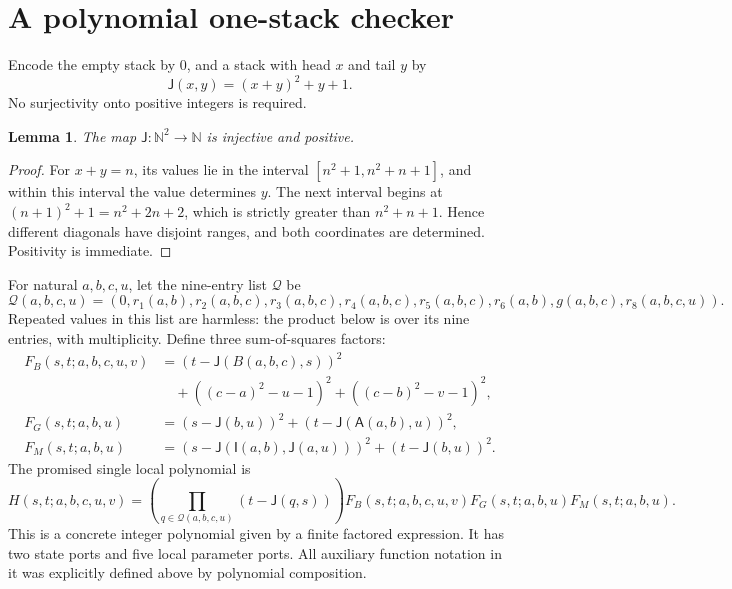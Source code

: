 \documentclass[11pt]{article}
\newcommand{\N}{\mathbb N}
\newcommand{\Imp}{\mathsf I}
\newcommand{\All}{\mathsf A}
\newcommand{\J}{\mathsf J}
\newtheorem{lemma}{Lemma}
\begin{document}
\section{A polynomial one-stack checker}

Encode the empty stack by 0, and a stack with head \(x\) and tail \(y\) by
\[
  \J(x,y)=(x+y)^2+y+1.
\]
No surjectivity onto positive integers is required.

\begin{lemma}
The map \(\J:\N^2\to\N\) is injective and positive.
\end{lemma}
\begin{proof}
For \(x+y=n\), its values lie in the interval
\([n^2+1,n^2+n+1]\), and within this interval the value determines \(y\).
The next interval begins at \((n+1)^2+1=n^2+2n+2\), which is strictly
greater than \(n^2+n+1\). Hence different diagonals have disjoint ranges,
and both coordinates are determined. Positivity is immediate.
\end{proof}

For natural \(a,b,c,u\), let the nine-entry list \(\mathcal Q\) be
\[
 \mathcal Q(a,b,c,u)=
 (0,r_1(a,b),r_2(a,b,c),r_3(a,b,c),r_4(a,b,c),
 r_5(a,b,c),r_6(a,b),g(a,b,c),r_8(a,b,c,u)).
\]
Repeated values in this list are harmless: the product below is over
its nine entries, with multiplicity. Define three sum-of-squares factors:
\begin{align*}
 F_B(s,t;a,b,c,u,v)
   &=(t-\J(B(a,b,c),s))^2\\
   &\quad+((c-a)^2-u-1)^2+((c-b)^2-v-1)^2,\\
 F_G(s,t;a,b,u)
   &=(s-\J(b,u))^2+(t-\J(\All(a,b),u))^2,\\
 F_M(s,t;a,b,u)
   &=(s-\J(\Imp(a,b),\J(a,u)))^2+(t-\J(b,u))^2.
\end{align*}
The promised single local polynomial is
\[
 \boxed{\displaystyle
 H(s,t;a,b,c,u,v)=
 \left(\prod_{q\in\mathcal Q(a,b,c,u)}(t-\J(q,s))\right)
 F_B(s,t;a,b,c,u,v)F_G(s,t;a,b,u)F_M(s,t;a,b,u).}
\]
This is a concrete integer polynomial given by a finite factored expression.
It has two state ports and five local parameter ports. All auxiliary
function notation in it was explicitly defined above by polynomial
composition.
\end{document}
